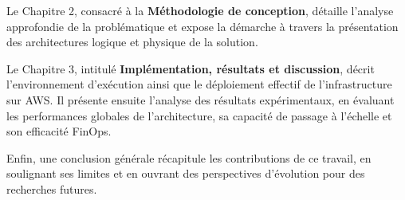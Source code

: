 Le Chapitre 2, consacré à la \textbf{Méthodologie de conception}, détaille l'analyse approfondie de la problématique et expose la démarche à travers la présentation des architectures logique et physique de la solution.

Le Chapitre 3, intitulé \textbf{Implémentation, résultats et discussion}, décrit l'environnement d'exécution ainsi que le déploiement effectif de l'infrastructure sur AWS. Il présente ensuite l'analyse des résultats expérimentaux, en évaluant les performances globales de l'architecture, sa capacité de passage à l'échelle et son efficacité FinOps. 

Enfin, une conclusion générale récapitule les contributions de ce travail, en soulignant ses limites et en ouvrant des perspectives d'évolution pour des recherches futures.